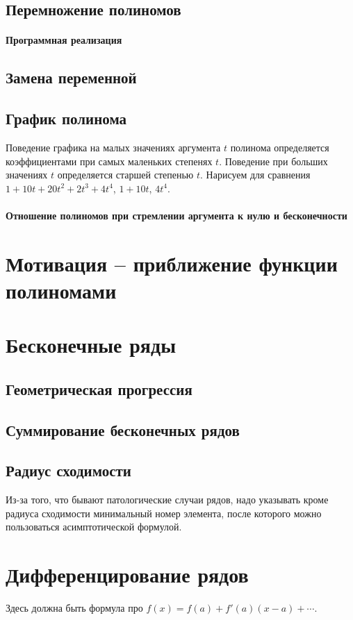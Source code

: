 \documentclass{article}
\begin{document}
\subsection{Перемножение полиномов}
\paragraph{Программная реализация}
\subsection{Замена переменной}
\subsection{График полинома}
Поведение графика на малых значениях аргумента $t$ полинома определяется коэффициентами при самых маленьких степенях $t$. Поведение при больших значениях $t$ определяется старшей степенью $t$. Нарисуем для сравнения $1+10t+20t^2+2t^3+4t^4$, $1+10t$, $4t^4$. 
\paragraph{Отношение полиномов при стремлении аргумента к нулю и бесконечности}

\section{Мотивация -- приближение функции полиномами}
\section{Бесконечные ряды }
\subsection{Геометрическая прогрессия}
\subsection{Суммирование бесконечных рядов}
\subsection{Радиус сходимости}
Из-за того, что бывают патологические случаи рядов, надо указывать кроме радиуса сходимости минимальный номер элемента, после которого можно пользоваться асимптотической формулой.
\section{Дифференцирование рядов}
Здесь должна быть формула про $f(x)=f(a)+f'(a)(x-a)+\cdots$.
\end{document}
